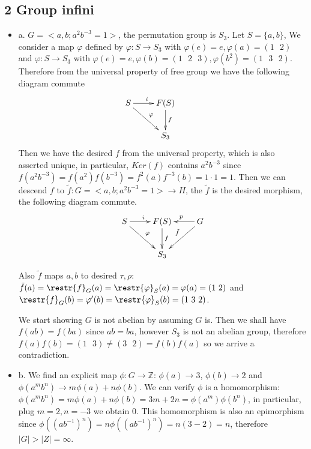 \documentclass[11pt]{article}
\def\Z{{\mathbb Z}}
\theoremstyle{remark}
\begin{document}
\subsection*{2 Group infini }
\begin{itemize}
    \item a. $G=<a,b;a^2b^{-3}=1>$, the permutation group is $S_3$.
    Let $S=\textrm{\{}a,b\textrm{\}}$, We consider a map $\varphi$ defined by $\varphi: S \rightarrow S_3$ with $\varphi(e)=e,\varphi(a)=(1\textrm{ }2)$ and $\varphi: S \rightarrow S_3$ with $\varphi(e)=e,\varphi(b)=(1\textrm{ }2 \textrm{ }3) ,\varphi(b^2)=(1\textrm{ }3 \textrm{ }2)$. Therefore from the universal property of free group we have the following diagram commute
    \[
    \xymatrix{
    S \ar[r]^{i}\ar[dr]^{\varphi} & F(S) \ar[d]^{f}&  \\
    & S_3 &
    }
    \]
     Then we have the desired $f$ from the universal property, which is also asserted unique, in particular, $Ker(f)$ contains $a^2b^{-3}$ since $f(a^2b^{-3})=f(a^2)f(b^{-3})=f^2(a)f^{-3}(b)=1\cdot 1=1$. Then we can descend $f$ to $\tilde{f}:G=<a,b;a^2b^{-3}=1> \rightarrow H$, the $\tilde{f}$ is the desired morphism, the following diagram commute.
    \[
    \xymatrix{
    S \ar[r]^{i}\ar[dr]^{\varphi} & F(S) \ar[d]^{f}&  G \ar[l]_{p} \ar[dl]_{\tilde{f}}\\
    & S_3 &
    }
    \]
     
     Also $\tilde{f}$ maps $a,b$ to desired $\tau,\rho$: $\tilde{f}(a)=\restr{f}_{G}(a)=\restr{\varphi}_{S}(a)=\varphi(a)=(1\textrm{ }2) $ and $\restr{f}_{G}(b)=\varphi'(b)=\restr{\varphi}_{S}(b)=(1\textrm{ }3 \textrm{ }2)$. 
     
    We start showing $G$ is not abelian by assuming $G$ is. Then we shall have $f(ab)=f(ba)$ since $ab=ba$, however $S_3 $ is not an abelian group, therefore $f(a)f(b)=(1\textrm{ }3)\neq(3\textrm{ }2)=f(b)f(a)$ so we arrive a contradiction.
    
    \item b. We find an explicit map $\phi:G\rightarrow \Z$: $\phi(a)\rightarrow 3$,  $\phi(b)\rightarrow 2$ and $\phi(a^mb^n)\rightarrow m\phi(a)+n\phi(b) $. We can verify $\phi$ is a homomorphism: $\phi(a^mb^n)=m\phi(a)+n\phi(b)=3m+2n=\phi(a^m)\phi(b^n)$,
    in particular, plug $m=2,n=-3$ we obtain $0$. This homomorphism is also an epimorphism since $\phi((ab^{-1})^n)=n\phi((ab^{-1})^n)=n(3-2)=n$, therefore $|G|>|Z|=\infty$.
    
\end{itemize}
\end{document}
